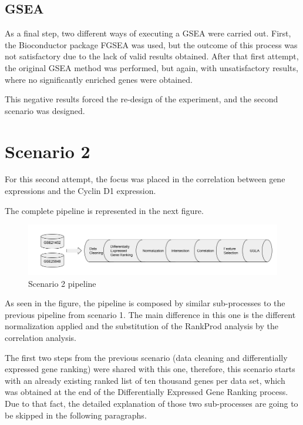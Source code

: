 \subsection{GSEA}
As a final step, two different ways of executing a GSEA were carried out.
First, the Bioconductor package FGSEA\cite{fgsea} was used, but the outcome of this process was not satisfactory due to the lack of valid results obtained.
After that first attempt, the original GSEA method\cite{Subramanian15545} was performed, but again, with unsatisfactory results, where no significantly enriched genes were obtained.

This negative results forced the re-design of the experiment, and the second scenario was designed.

\newpage
\section{Scenario 2}

For this second attempt, the focus was placed in the correlation between gene expressions and the Cyclin D1 expression.

The complete pipeline is represented in the next figure.

\begin{figure}[h]
    \centering
    \includegraphics[scale=0.5]{../figs/scenario_2_figure.png}
    \caption{Scenario 2 pipeline}
    \label{fig:scenario-2}
\end{figure}

As seen in the figure, the pipeline is composed by similar sub-processes to the previous pipeline from scenario 1. The main difference in this one is the different normalization applied and the substitution of the RankProd analysis by the correlation analysis.

The first two steps from the previous scenario (data cleaning and differentially expressed gene ranking) were shared with this one, therefore, this scenario starts with an already existing ranked list of ten thousand genes per data set, which was obtained at the end of the Differentially Expressed Gene Ranking process. Due to that fact, the detailed explanation of those two sub-processes are going to be skipped in the following paragraphs.


